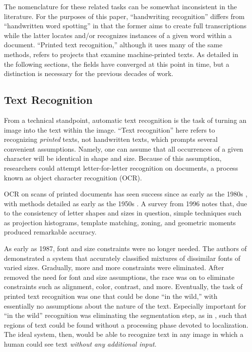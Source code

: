 \documentclass[final]{ukthesis}
\begin{document}
The nomenclature for these related tasks can be somewhat inconsistent in the literature. For the purposes of this paper, ``handwriting recognition'' differs from ``handwritten word spotting'' in that the former aims to create full transcriptions while the latter locates and/or recognizes instances of a given word within a document. ``Printed text recognition,'' although it uses many of the same methods, refers to projects that examine machine-printed texts. As detailed in the following sections, the fields have converged at this point in time, but a distinction is necessary for the previous decades of work.


\subsection{Text Recognition}
From a technical standpoint, automatic text recognition is the task of turning an image into the text within the image. ``Text recognition'' here refers to recognizing {\em printed} texts, not handwritten texts, which prompts several convenient assumptions. Namely, one can assume that all occurrences of a given character will be identical in shape and size. Because of this assumption, researchers could attempt letter-for-letter recognition on documents, a process known as object character recognition (OCR).

OCR on scans of printed documents has seen success since as early as the 1980s \cite{mantas1986overview,govindan1990character}, with methods detailed as early as the 1950s \cite{glauberman1956character}. A survey from 1996 \cite{trier1996feature} notes that, due to the consistency of letter shapes and sizes in question, simple techniques such as projection histograms, template matching, zoning, and geometric moments produced remarkable accuracy.

As early as 1987, font and size constraints were no longer needed. The authors of \cite{kahan1987recognition} demonstrated a system that accurately classified mixtures of dissimilar fonts of varied sizes. Gradually, more and more constraints were eliminated. After \cite{kahan1987recognition} removed the need for font and size assumptions, the race was on to eliminate constraints such as alignment, color, contrast, and more. Eventually, the task of printed text recognition was one that could be done ``in the wild,'' \cite{smith2007overview,wang2012end,jaderberg2016reading} with essentially no assumptions about the nature of the text. Especially important for ``in the wild'' recognition was eliminating the segmentation step, as in \cite{rusinol2015efficient}, such that regions of text could be found without a processing phase devoted to localization. The ideal system, then, would be able to recognize text in any image in which a human could see text {\em without any additional input}.
\end{document}
